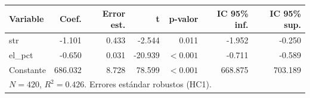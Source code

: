 
\begin{tabular}{lrrrrrr}
\toprule
Variable & Coef. & Error est. & t & p-valor & IC 95\% inf. & IC 95\% sup.\\
\midrule
str & -1.101 & 0.433 & -2.544 & 0.011 & -1.952 & -0.250\\
el\_pct & -0.650 & 0.031 & -20.939 & $<0.001$ & -0.711 & -0.589\\
Constante & 686.032 & 8.728 & 78.599 & $<0.001$ & 668.875 & 703.189\\
\midrule
\multicolumn{7}{l}{$N=420$, $R^2=0.426$. Errores estándar robustos (HC1).}\\
\bottomrule
\end{tabular}
